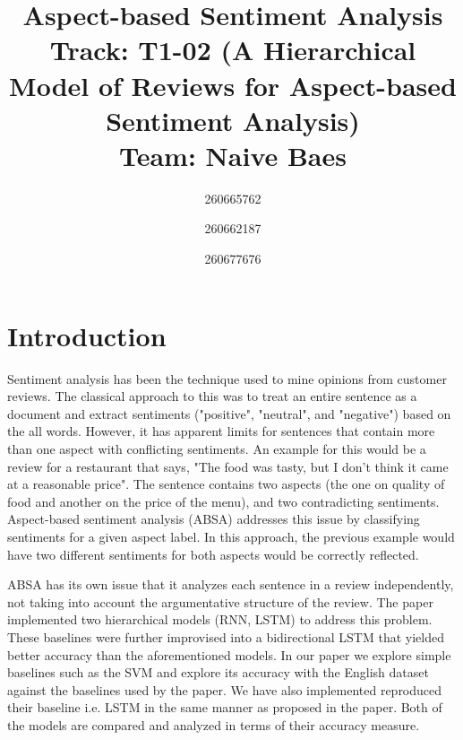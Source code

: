 \documentclass[comsoc,conference]{IEEEtran}
\begin{document}
\title{Aspect-based Sentiment Analysis
	\\ \large{Track: T1-02 (A Hierarchical Model of Reviews for Aspect-based Sentiment Analysis)
	\\ Team: Naive Baes}
}

\author{
	260665762
	\and
	260662187
	\and
	260677676
}

\maketitle

\section{Introduction}

Sentiment analysis has been the technique used to mine opinions from customer reviews. The classical approach to this was to treat an entire sentence as a document and extract sentiments ("positive", "neutral", and "negative") based on the all words. However, it has apparent limits for sentences that contain more than one aspect with conflicting sentiments. An example for this would be a review for a restaurant that says, "The food was tasty, but I don't think it came at a reasonable price". The sentence contains two aspects (the one on quality of food and another on the price of the menu), and two contradicting sentiments. Aspect-based sentiment analysis (ABSA) addresses this issue by classifying sentiments for a given aspect label. In this approach, the previous example would have two different sentiments for both aspects would be correctly reflected.

ABSA has its own issue that it analyzes each sentence in a review independently, not taking into account the argumentative structure of the review. The paper implemented two hierarchical models (RNN, LSTM) to address this problem. These baselines were further improvised into a bidirectional LSTM that yielded better accuracy than the aforementioned models. In our paper we explore simple baselines such as the SVM and explore its accuracy with the English dataset against the baselines used by the paper. We have also implemented reproduced their baseline i.e. LSTM in the same manner as proposed in the paper. Both of the models are compared and analyzed in terms of their accuracy measure.
\end{document}
